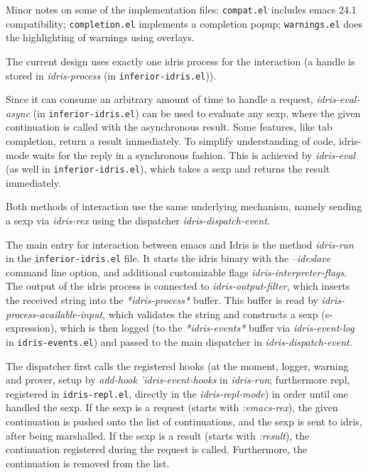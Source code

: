 \documentclass{article}
\begin{document}
Minor notes on some of the implementation files: \texttt{compat.el} includes emacs 24.1 compatibility; \texttt{completion.el} implements a completion popup; \texttt{warnings.el} does the highlighting of warnings using overlays.

The current design uses exactly one idris process for the interaction (a handle is stored in \emph{idris-process} (in \texttt{inferior-idris.el})).

Since it can consume an arbitrary amount of time to handle a request, \emph{idris-eval-async} (in \texttt{inferior-idris.el}) can be used to evaluate any sexp, where the given continuation is called with the asynchronous result.
Some features, like tab completion, return a result immediately.
To simplify understanding of code, idris-mode waits for the reply in a synchronous fashion.
This is achieved by \emph{idris-eval} (as well in \texttt{inferior-idris.el}), which takes a sexp and returns the result immediately.

Both methods of interaction use the same underlying mechanism, namely sending a sexp via \emph{idris-rex} using the dispatcher \emph{idris-dispatch-event}.

The main entry for interaction between emacs and Idris is the method \emph{idris-run} in the \texttt{inferior-idris.el} file.
It starts the idris binary with the \emph{--ideslave} command line option, and additional customizable flags \emph{idris-interpreter-flags}.
The output of the idris process is connected to \emph{idris-output-filter}, which inserts the received string into the \emph{*idris-process*} buffer.
This buffer is read by \emph{idris-process-available-input}, which validates the string and constructs a sexp (s-expression), which is then logged (to the \emph{*idris-events*} buffer via \emph{idris-event-log} in \texttt{idris-events.el}) and passed to the main dispatcher in \emph{idris-dispatch-event}.

The dispatcher first calls the registered hooks (at the moment, logger, warning and prover, setup by \emph{add-hook 'idris-event-hooks} in \emph{idris-run}; furthermore repl, registered in \texttt{idris-repl.el}, directly in the \emph{idris-repl-mode}) in order until one handled the sexp.
If the sexp is a request (starts with \emph{:emacs-rex}), the given continuation is pushed onto the list of continuations, and the sexp is sent to idris, after being marshalled.
If the sexp is a result (starts with \emph{:result}), the continuation registered during the request is called.
Furthermore, the continuation is removed from the list.
\end{document}
